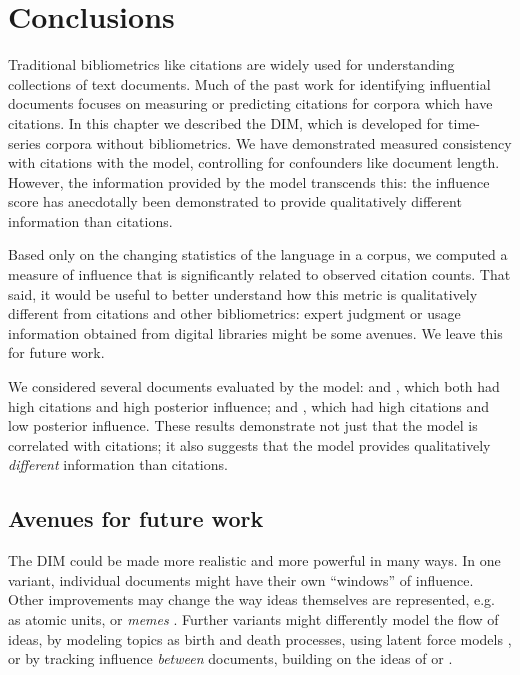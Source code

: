 

\section{Conclusions}

Traditional bibliometrics like citations are widely used for
understanding collections of text documents.  Much of the past work
for identifying influential documents focuses on measuring or
predicting citations for corpora which have citations.  In this
chapter we described the DIM, which is developed for time-series
corpora without bibliometrics.  We have demonstrated measured
consistency with citations with the model, controlling for confounders
like document length.  However, the information provided by the model
transcends this: the influence score has anecdotally been demonstrated
to provide qualitatively different information than citations.

Based only on the changing statistics of the language in a corpus, we
computed a measure of influence that is significantly related to
observed citation counts. That said, it would be useful to better
understand how this metric is qualitatively different from citations
and other bibliometrics: expert judgment or usage information obtained
from digital libraries might be some avenues.  We leave this for
future work.

We considered several documents evaluated by the model:
\cite{brown:1993} and \cite{toole:1984}, which both had high citations
and high posterior influence; and \cite{marcus:1993}, which had high
citations and low posterior influence.
These results demonstrate not just that the model is correlated with
citations; it also suggests that the model provides qualitatively
\emph{different} information than citations.

\subsection{Avenues for future work}
The DIM could be made more realistic and more powerful in many ways.
In one variant, individual documents might have their own ``windows''
of influence.  Other improvements may change the way ideas themselves
are represented, e.g. as atomic units, or \emph{memes}
\citep{leskovec:2009}.  Further variants might differently model the
flow of ideas, by modeling topics as birth and death processes, using
latent force models \citep{alvarez:2009}, or by tracking influence
\emph{between} documents, building on the ideas of
\cite{shaparenko:2007} or \cite{dietz:2007}. %

